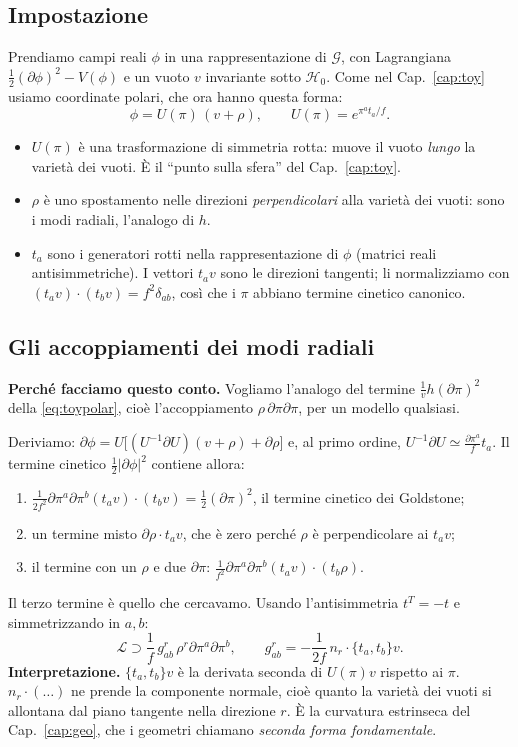 \documentclass[11pt,a4paper]{article}
\numberwithin{equation}{section}
\theoremstyle{remark}
\newcommand{\G}{\mathcal{G}}
\newcommand{\Hg}{\mathcal{H}_0}
\begin{document}
\subsection{Impostazione}

Prendiamo campi reali $\phi$ in una rappresentazione di $\G$, con Lagrangiana $\frac12(\partial\phi)^2-V(\phi)$ e un vuoto $v$ invariante sotto $\Hg$. Come nel Cap.~\ref{cap:toy} usiamo coordinate polari, che ora hanno questa forma:
\[
\phi=U(\pi)\,(v+\rho),\qquad U(\pi)=e^{\pi^at_a/f}.
\]
\begin{itemize}
\item $U(\pi)$ è una trasformazione di simmetria rotta: muove il vuoto \emph{lungo} la varietà dei vuoti. È il ``punto sulla sfera'' del Cap.~\ref{cap:toy}.
\item $\rho$ è uno spostamento nelle direzioni \emph{perpendicolari} alla varietà dei vuoti: sono i modi radiali, l'analogo di $h$.
\item $t_a$ sono i generatori rotti nella rappresentazione di $\phi$ (matrici reali antisimmetriche). I vettori $t_av$ sono le direzioni tangenti; li normalizziamo con $(t_av)\cdot(t_bv)=f^2\delta_{ab}$, così che i $\pi$ abbiano termine cinetico canonico.
\end{itemize}

\subsection{Gli accoppiamenti dei modi radiali}

\textbf{Perché facciamo questo conto.} Vogliamo l'analogo del termine $\frac1vh(\partial\pi)^2$ della \eqref{eq:toypolar}, cioè l'accoppiamento $\rho\,\partial\pi\partial\pi$, per un modello qualsiasi.

Deriviamo: $\partial\phi=U\big[(U^{-1}\partial U)(v+\rho)+\partial\rho\big]$ e, al primo ordine, $U^{-1}\partial U\simeq\frac{\partial\pi^a}{f}t_a$. Il termine cinetico $\frac12|\partial\phi|^2$ contiene allora:
\begin{enumerate}
\item $\frac{1}{2f^2}\partial\pi^a\partial\pi^b(t_av)\cdot(t_bv)=\frac12(\partial\pi)^2$, il termine cinetico dei Goldstone;
\item un termine misto $\partial\rho\cdot t_av$, che è zero perché $\rho$ è perpendicolare ai $t_av$;
\item il termine con un $\rho$ e due $\partial\pi$: $\frac{1}{f^2}\partial\pi^a\partial\pi^b(t_av)\cdot(t_b\rho)$.
\end{enumerate}
Il terzo termine è quello che cercavamo. Usando l'antisimmetria $t^T=-t$ e simmetrizzando in $a,b$:
\begin{equation}
\mathcal L\supset\frac1f\,g^r_{ab}\,\rho^r\partial\pi^a\partial\pi^b,\qquad g^r_{ab}=-\frac{1}{2f}\,n_r\cdot\{t_a,t_b\}v .
\end{equation}
\textbf{Interpretazione.} $\{t_a,t_b\}v$ è la derivata seconda di $U(\pi)v$ rispetto ai $\pi$. $n_r\cdot(\ldots)$ ne prende la componente normale, cioè quanto la varietà dei vuoti si allontana dal piano tangente nella direzione $r$. È la curvatura estrinseca del Cap.~\ref{cap:geo}, che i geometri chiamano \emph{seconda forma fondamentale}.
\end{document}
